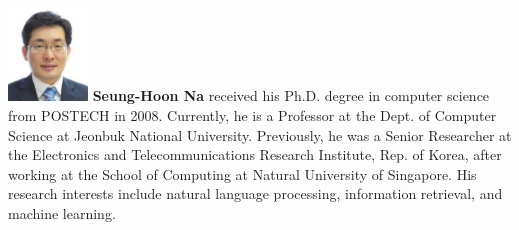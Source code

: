 \documentclass[AMS,STIX2COL]{WileyNJD-v2}
\begin{document}
    \begin{biography}
    {\includegraphics[width=60pt,height=70pt]{author4}}
    {\textbf{Seung-Hoon Na} received his Ph.D. degree in computer science from POSTECH in 2008. Currently, he is a Professor at the Dept. of Computer Science at Jeonbuk National University. Previously, he was a Senior Researcher at the Electronics and Telecommunications Research Institute, Rep. of Korea, after working at the School of Computing at Natural University of Singapore. His research interests include natural language processing, information retrieval, and machine learning.}
    \end{biography}
\end{document}
